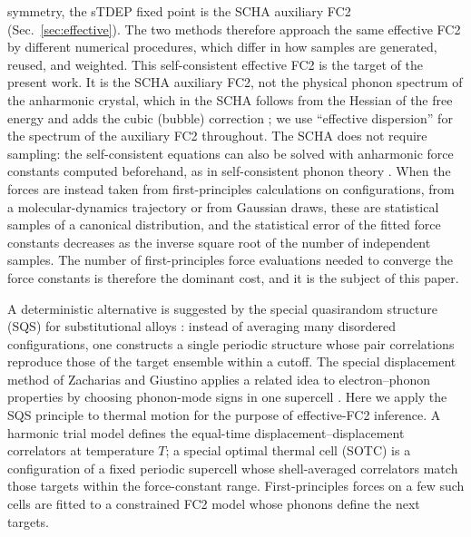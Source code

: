 \documentclass[aip,jap,reprint,amsmath,amssymb,floatfix]{revtex4-2}
\begin{document}
symmetry, the sTDEP fixed point is the SCHA auxiliary FC2
(Sec.~\ref{sec:effective}). The two methods therefore approach the same
effective FC2 by different numerical procedures, which differ in how samples
are generated, reused, and weighted. This self-consistent effective FC2 is
the target of the present work. It is the SCHA auxiliary FC2, not the
physical phonon spectrum of the anharmonic crystal, which in the SCHA follows
from the Hessian of the free energy and adds the cubic (bubble) correction
\cite{ref8}; we use ``effective dispersion'' for the spectrum of the auxiliary
FC2 throughout. The SCHA does not require sampling: the self-consistent
equations can also be solved with anharmonic force constants computed
beforehand, as in self-consistent phonon theory \cite{tadano2015}. When the forces are instead
taken from first-principles calculations on configurations, from a
molecular-dynamics trajectory or from Gaussian draws, these are statistical
samples of a canonical distribution, and the statistical error of the fitted
force constants decreases as the inverse square root of the number of
independent samples.
The number of first-principles force evaluations needed to converge the force
constants is therefore the dominant cost, and it is the subject of this
paper.

A deterministic alternative is suggested by the special quasirandom structure
(SQS) for substitutional alloys \cite{ref12}: instead of averaging many
disordered configurations, one constructs a single periodic structure whose pair
correlations reproduce those of the target ensemble within a cutoff. The
special displacement method of Zacharias and Giustino applies a related idea to
electron--phonon properties by choosing phonon-mode signs in one supercell
\cite{ref42}. Here we apply the SQS principle to thermal motion for the purpose
of effective-FC2 inference. A harmonic trial model defines the equal-time
displacement--displacement correlators at temperature $T$; a special optimal
thermal cell (SOTC) is a configuration of a fixed periodic supercell whose
shell-averaged correlators match those targets within the force-constant
range. First-principles forces on a few such cells are fitted to a constrained
FC2 model whose phonons define the next targets.
\end{document}

